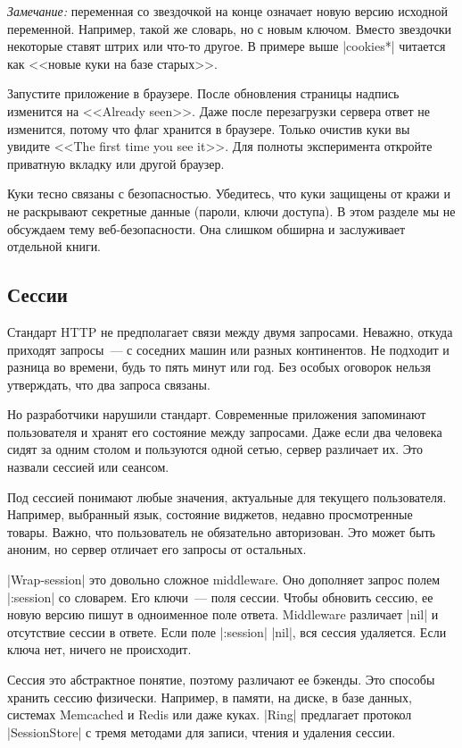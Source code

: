 \emph{Замечание:} переменная со звездочкой на конце означает новую версию
исходной переменной. Например, такой же словарь, но с новым ключом. Вместо
звездочки некоторые ставят штрих или что-то другое. В примере выше
\spverb|cookies*| читается как <<новые куки на базе старых>>.

Запустите приложение в браузере. После обновления страницы надпись изменится на
<<Already seen>>. Даже после перезагрузки сервера ответ не изменится, потому что
флаг хранится в браузере. Только очистив куки вы увидите <<The first time
you see it>>. Для полноты эксперимента откройте приватную вкладку или другой
браузер.

Куки тесно связаны с безопасностью. Убедитесь, что куки защищены от кражи и не
раскрывают секретные данные (пароли, ключи доступа). В этом разделе мы не
обсуждаем тему веб-безопасности. Она слишком обширна и заслуживает отдельной
книги.

\subsection{Сессии}

Стандарт HTTP не предполагает связи между двумя запросами. Неважно, откуда
приходят запросы~--- с соседних машин или разных континентов. Не подходит и
разница во времени, будь то пять минут или год. Без особых оговорок нельзя
утверждать, что два запроса связаны.

Но разработчики нарушили стандарт. Современные приложения запоминают
пользователя и хранят его состояние между запросами. Даже если два человека
сидят за одним столом и пользуются одной сетью, сервер различает их. Это назвали
сессией или сеансом.

Под сессией понимают любые значения, актуальные для текущего
пользователя. Например, выбранный язык, состояние виджетов, недавно
просмотренные товары. Важно, что пользователь не обязательно авторизован. Это
может быть аноним, но сервер отличает его запросы от остальных.

\spverb|Wrap-session| это довольно сложное middleware. Оно дополняет запрос
полем \spverb|:session| со словарем. Его ключи~--- поля сессии. Чтобы обновить
сессию, ее новую версию пишут в одноименное поле ответа. Middleware различает
\spverb|nil| и отсутствие сессии в ответе. Если поле \spverb|:session|
\spverb|nil|, вся сессия удаляется. Если ключа нет, ничего не происходит.

Сессия это абстрактное понятие, поэтому различают ее бэкенды. Это способы
хранить сессию физически. Например, в памяти, на диске, в базе данных, системах
Memcached и Redis или даже куках. \spverb|Ring| предлагает протокол
\spverb|SessionStore| с тремя методами для записи, чтения и удаления сессии.

